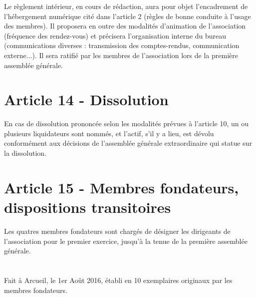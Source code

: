 \documentclass[a4paper,oneside,10pt]{article}
\begin{document}
Le règlement intérieur, en cours de rédaction, aura pour objet l'encadrement de l'hébergement numérique cité dans l'article 2 (règles de bonne conduite à l'usage des membres). Il proposera en outre des modalités d'animation de l'association (fréquence des rendez-vous) et précisera l'organisation interne du bureau (communications diverses : transmission des comptes-rendus, communication externe...). Il sera ratifié par les membres de l'association lors de la première assemblée générale.

\section*{Article 14 - Dissolution}

En cas de dissolution prononcée selon les modalités prévues à l'article 10, un ou plusieurs liquidateurs sont nommés, et l'actif, s'il y a lieu, est dévolu conformément aux décisions de l'assemblée générale extraordinaire qui statue sur la dissolution.

\section*{Article 15 - Membres fondateurs, dispositions transitoires}

Les quatres membres fondateurs sont chargés de désigner les dirigeants de l'association pour le premier exercice, jusqu'à la tenue de la première assemblée générale.

\section*{}

Fait à Arcueil, le 1er Août 2016, établi en 10 exemplaires originaux par les membres fondateurs.
\end{document}
